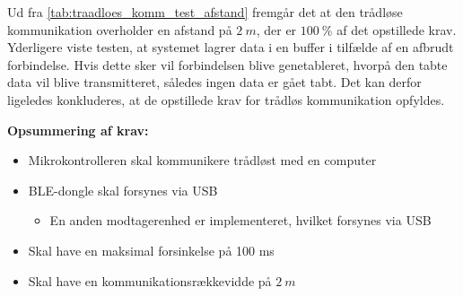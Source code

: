 \noindent
Ud fra \autoref{tab:traadloes_komm_test_afstand} fremgår det at den trådløse kommunikation overholder en afstand på $2~m$, der er $100~\%$ af det opstillede krav. Yderligere viste testen, at systemet lagrer data i en buffer i tilfælde af en afbrudt forbindelse. Hvis dette sker vil forbindelsen blive genetableret, hvorpå den tabte data vil blive transmitteret, således ingen data er gået tabt. Det kan derfor ligeledes konkluderes, at de opstillede krav for trådløs kommunikation opfyldes.
\vspace{3mm}

\textbf{Opsummering af krav:}
\begin{itemize}
\item[\text{\sffamily \checkmark}] Mikrokontrolleren skal kommunikere trådløst med en computer
\item BLE-dongle skal forsynes via USB
\begin{itemize}
\item[\text{\sffamily \checkmark}] En anden modtagerenhed er implementeret, hvilket forsynes via USB
\end{itemize}
\item Skal have en maksimal forsinkelse på 100 ms 
\item[\text{\sffamily \checkmark}] Skal have en kommunikationsrækkevidde på $2~m$
\end{itemize}